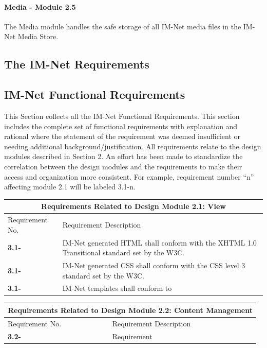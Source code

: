 \documentclass[letterpaper,12pt]{article}
\newcounter{rcounter}						%
\newcommand\rnumber{\stepcounter{rcounter}\arabic{rcounter}}
\newcommand{\Section}[1]{\section{#1} \setcounter{figure}{0}}
\begin{document}
{\paragraph{Media - Module 2.5}
The Media module handles the safe storage of all IM-Net media files in the IM-Net Media Store.


\eject

\textcolor{section}{\Section{The IM-Net Requirements}}
 
\textcolor{subsection}{\subsection{IM-Net Functional Requirements}}

This Section collects all the IM-Net Functional Requirements. This section includes the complete set of functional requirements with explanation and rational where the statement of the requirement was deemed insufficient or needing additional background/justification. All requirements relate to the design modules described in Section 2. An effort has been made to standardize the correlation between the design modules and the requirements to make their access and organization more consistent. For example, requirement number ``n'' affecting module 2.1 will be labeled 3.1-n.

\setcounter{rcounter}{0}

\begin{center}
\begin{tabular}{|l|p{6in}|}
\hline 
\multicolumn{2}{|c|}{\textbf{Requirements Related to Design Module 2.1: View}} \\ 
\hline 
Requirement No. & Requirement Description \\ 
\hline
\textbf{3.1-\rnumber} & IM-Net generated HTML shall conform with the XHTML 1.0 Transitional standard set by the W3C. \\ 
\hline 
\textbf{3.1-\rnumber} & IM-Net generated CSS shall conform with the CSS level 3 standard set by the W3C. \\ 
\hline 
\textbf{3.1-\rnumber} & IM-Net templates shall conform to  \\ 
\hline 
\end{tabular} 
\end{center}

\setcounter{rcounter}{0}
\begin{center}
\begin{tabular}{|l|p{6in}|}
\hline 
\multicolumn{2}{|c|}{\textbf{Requirements Related to Design Module 2.2: Content Management}} \\ 
\hline 
Requirement No. & Requirement Description \\ 
\hline
\textbf{3.2-\rnumber} & Requirement \\ 
\hline 
\end{tabular} 
\end{center}

}
\end{document}
